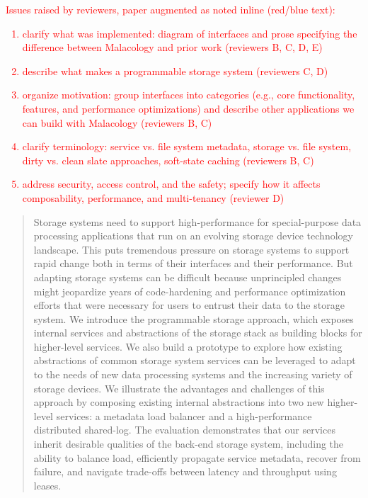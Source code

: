 \begin{notes}
\textcolor{red}{
\noindent Issues raised by reviewers, paper augmented as noted inline (red/blue text):
\begin{enumerate}
  \item clarify what was implemented: diagram of interfaces and prose
  specifying the difference between Malacology and prior work (reviewers B, C,
  D, E)
  \item describe what makes a programmable storage system (reviewers C, D)
  \item organize motivation: group interfaces into categories (e.g., core
  functionality, features, and performance optimizations) and describe other
  applications we can build with Malacology (reviewers B, C)
  \item clarify terminology: service vs. file system metadata, storage vs.
  file system, dirty vs. clean slate approaches, soft-state caching (reviewers
  B, C)
  \item address security, access control, and the safety; specify how it
  affects composability, performance, and multi-tenancy (reviewer D)
\end{enumerate}
}
\end{notes}

\begin{abstract} Storage systems need to support high-performance for
special-purpose data processing applications that run on an evolving storage
device technology landscape.  This puts tremendous pressure on storage systems
to support rapid change both in terms of their interfaces and their
performance. But adapting storage systems can be difficult because unprincipled
changes might jeopardize years of code-hardening and performance optimization
efforts that were necessary for users to entrust their data to the storage
system. We introduce the programmable storage approach, which exposes internal
services and abstractions of the storage stack as building blocks for
higher-level services. We also build a prototype to explore how existing
abstractions of common storage system services can be leveraged to adapt to the
needs of new data processing systems and the increasing variety of storage
devices.  We illustrate the advantages and challenges of this approach by
composing existing internal abstractions into two new higher-level services: a
 metadata load balancer and a high-performance
distributed shared-log.  The evaluation demonstrates that our services inherit
desirable qualities of the back-end storage system, including the ability to
balance load, efficiently propagate service metadata, recover from failure, and
navigate trade-offs between latency and throughput using leases.
\end{abstract}
